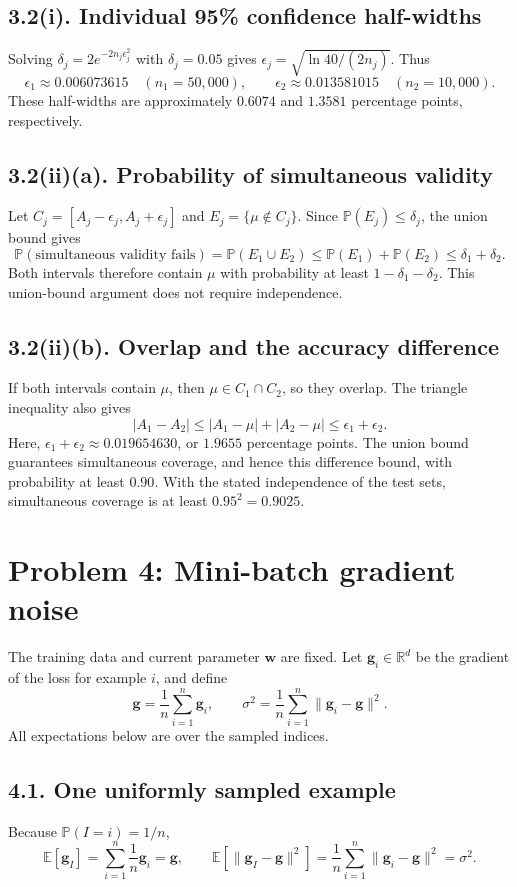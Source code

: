 \subsection*{3.2(i). Individual 95\% confidence half-widths}
Solving $\delta_j=2e^{-2n_j\epsilon_j^2}$ with $\delta_j=0.05$ gives
$\epsilon_j=\sqrt{\ln40/(2n_j)}$. Thus
\[
\boxed{\epsilon_1\approx0.006073615}\quad(n_1=50{,}000),
\qquad
\boxed{\epsilon_2\approx0.013581015}\quad(n_2=10{,}000).
\]
These half-widths are approximately $0.6074$ and $1.3581$ percentage points, respectively.

\subsection*{3.2(ii)(a). Probability of simultaneous validity}
Let $C_j=[A_j-\epsilon_j,A_j+\epsilon_j]$ and $E_j=\{\mu\notin C_j\}$.
Since $\mathbb{P}(E_j)\le\delta_j$, the union bound gives
\[
\boxed{\mathbb{P}(\text{simultaneous validity fails})
=\mathbb{P}(E_1\cup E_2)
\le\mathbb{P}(E_1)+\mathbb{P}(E_2)
\le\delta_1+\delta_2.}
\]
Both intervals therefore contain $\mu$ with probability at least $1-\delta_1-\delta_2$.
This union-bound argument does not require independence.

\subsection*{3.2(ii)(b). Overlap and the accuracy difference}
If both intervals contain $\mu$, then $\mu\in C_1\cap C_2$, so they overlap.
The triangle inequality also gives
\[
\boxed{|A_1-A_2|\le|A_1-\mu|+|A_2-\mu|\le\epsilon_1+\epsilon_2.}
\]
Here, $\epsilon_1+\epsilon_2\approx0.019654630$, or $1.9655$ percentage points.
The union bound guarantees simultaneous coverage, and hence this difference bound, with probability at least $0.90$.
With the stated independence of the test sets, simultaneous coverage is at least $0.95^2=0.9025$.

\newpage
\section*{Problem 4: Mini-batch gradient noise}
The training data and current parameter $\mathbf{w}$ are fixed. Let $\mathbf{g}_i\in\mathbb{R}^d$ be the gradient of the loss for example $i$, and define
\[
\mathbf{g}=\frac1n\sum_{i=1}^{n}\mathbf{g}_i,
\qquad
\sigma^2=\frac1n\sum_{i=1}^{n}\|\mathbf{g}_i-\mathbf{g}\|^2.
\]
All expectations below are over the sampled indices.

\subsection*{4.1. One uniformly sampled example}
Because $\mathbb{P}(I=i)=1/n$,
\[
\boxed{\mathbb{E}[\mathbf{g}_I]=\sum_{i=1}^{n}\frac1n\mathbf{g}_i=\mathbf{g}},
\qquad
\boxed{\mathbb{E}\!\left[\|\mathbf{g}_I-\mathbf{g}\|^2\right]
=\frac1n\sum_{i=1}^{n}\|\mathbf{g}_i-\mathbf{g}\|^2=\sigma^2}.
\]

